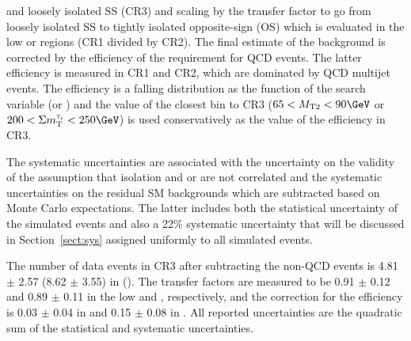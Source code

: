 and loosely isolated SS \tauTau (CR3)
and scaling by the transfer factor to go from loosely isolated SS to tightly isolated opposite-sign (OS) 
\tauTau which is evaluated in the low \mttwo or \SumMT regions (CR1 divided by CR2). The final estimate of the background
is corrected by the efficiency of 
the \deltaphi requirement for QCD events. The latter efficiency is measured in CR1 and CR2, 
which are dominated by QCD multijet events. The efficiency is a falling distribution as the function of 
the search variable (\mttwo or \SumMT)
and the value of the closest bin to CR3 ($65<\mttwo<90\GeV$ or $200<\SumMT<250\GeV$) is used conservatively as the 
value of the efficiency in CR3.

The systematic uncertainties are associated with the uncertainty on the validity 
of the assumption that isolation and \mttwo or \SumMT are not correlated and the systematic uncertainties on the residual 
SM backgrounds which  are subtracted based on Monte Carlo expectations. 
The latter includes both the statistical uncertainty of the simulated 
events and also a 22\% systematic uncertainty that will be discussed in Section~\ref{sect:sys} 
assigned uniformly to all simulated events.

The number of data events in CR3 after subtracting the non-QCD events is 4.81 $\pm$ 2.57 (8.62 $\pm$ 3.55) in \binone (\bintwo).
The transfer factors are measured to be 0.91 $\pm$ 0.12 and 0.89 $\pm$ 0.11 in the low \mttwo and \SumMT, respectively, and 
the correction for the \deltaphi efficiency is 0.03 $\pm$ 0.04 in \binone and 0.15 $\pm$ 0.08 in \bintwo. 
All reported uncertainties are the quadratic sum of the statistical and systematic uncertainties.

